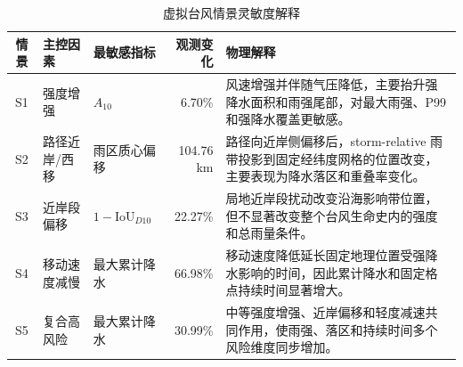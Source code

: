 \begin{table}[htbp]
\centering
\caption{虚拟台风情景灵敏度解释}
\label{tab:problem3_sensitivity}
\begin{tabular}{c l l r p{7.2cm}}
\hline
情景 & 主控因素 & 最敏感指标 & 观测变化 & 物理解释 \\
\hline
S1 & 强度增强 & $A_{10}$ & 6.70\% & 风速增强并伴随气压降低，主要抬升强降水面积和雨强尾部，对最大雨强、P99 和强降水覆盖更敏感。 \\
S2 & 路径近岸/西移 & 雨区质心偏移 & 104.76 km & 路径向近岸侧偏移后，storm-relative 雨带投影到固定经纬度网格的位置改变，主要表现为降水落区和重叠率变化。 \\
S3 & 近岸段偏移 & $1-\mathrm{IoU}_{D10}$ & 22.27\% & 局地近岸段扰动改变沿海影响带位置，但不显著改变整个台风生命史内的强度和总雨量条件。 \\
S4 & 移动速度减慢 & 最大累计降水 & 66.98\% & 移动速度降低延长固定地理位置受强降水影响的时间，因此累计降水和固定格点持续时间显著增大。 \\
S5 & 复合高风险 & 最大累计降水 & 30.99\% & 中等强度增强、近岸偏移和轻度减速共同作用，使雨强、落区和持续时间多个风险维度同步增加。 \\
\hline
\end{tabular}
\end{table}

